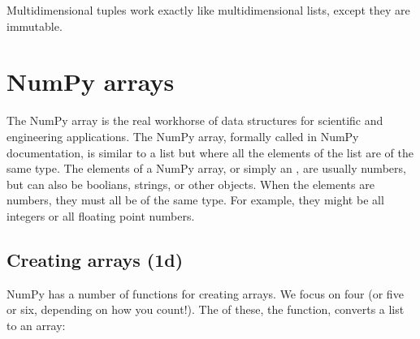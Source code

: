 \documentclass[letterpaper,10pt,english]{sphinxmanual}
\begin{document}
\sphinxAtStartPar
Multidimensional tuples work exactly like multidimensional lists, except they are immutable.

\ignorespaces 

\section{NumPy arrays}
\label{\detokenize{chap3/chap3_arrays:numpy-arrays}}\label{\detokenize{chap3/chap3_arrays:index-6}}
\sphinxAtStartPar
The NumPy array is the real workhorse of data structures for scientific and engineering applications.  The NumPy array, formally called  in NumPy documentation, is similar to a list but where all the elements of the list are of the same type.  The elements of a NumPy array, or simply an , are usually numbers, but can also be boolians, strings, or other objects.  When the elements are numbers, they must all be of the same type.  For example, they might be all integers or all floating point numbers.


\subsection{Creating arrays (1\sphinxhyphen{}d)}
\label{\detokenize{chap3/chap3_arrays:creating-arrays-1-d}}
\sphinxAtStartPar
NumPy has a number of functions for creating arrays.  We focus on four (or five or six, depending on how you count!).  The  of these, the  function, converts a list to an array:

\begin{sphinxVerbatim}[commandchars=\\\{\},numbers=left,firstnumber=1,stepnumber=1]
  \PYG{p}{[}        \PYG{p}{]}

  

\PYG{p}{[}              \PYG{p}{]}

  \PYG{p}{[}   \PYG{p}{]}

\PYG{p}{[}    \PYG{p}{]}
\end{sphinxVerbatim}
\end{document}
